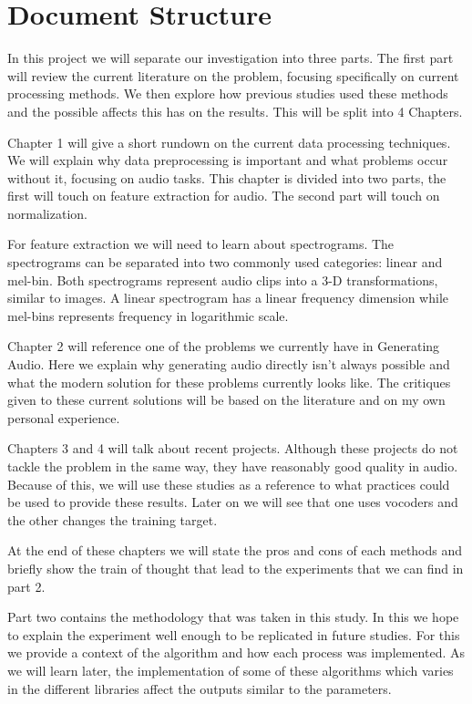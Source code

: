 \documentclass{book}
\begin{document}
\section{Document Structure}
\qquad In this project we will separate our investigation into three parts.
The first part will review the current literature on the problem, focusing specifically on current processing methods.
We then explore how previous studies used these methods and the possible affects this has on the results.
This will be split into 4 Chapters.
\par
Chapter 1 will give a short rundown on the current data processing techniques.
We will explain why data preprocessing is important and what problems occur without it, focusing on audio tasks.
This chapter is divided into two parts, the first will touch on feature extraction for audio.
The second part will touch on normalization.
\par
For feature extraction we will need to learn about spectrograms.
The spectrograms can be separated into two commonly used categories: linear and mel-bin.
Both spectrograms represent audio clips into a 3-D transformations, similar to images.
A linear spectrogram has a linear frequency dimension while mel-bins represents frequency in logarithmic scale.
\par
Chapter 2 will reference one of the problems we currently have in Generating Audio.
Here we explain why generating audio directly isn't always possible and what the modern solution for these problems currently looks like.
The critiques given to these current solutions will be based on the literature and on my own personal experience.
\par
Chapters 3 and 4 will talk about recent projects.
Although these projects do not tackle the problem in the same way, they have reasonably good quality in audio.
Because of this, we will use these studies as a reference to what practices could be used to provide these results.
Later on we will see that one uses vocoders and the other changes the training target.
\par
At the end of these chapters we will state the pros and cons of each methods and briefly show the train of thought that lead to the experiments that we can find in part 2.
\par Part two contains the methodology that was taken in this study.
In this we hope to explain the experiment well enough to be replicated in future studies.
For this we provide a context of the algorithm and how each process was implemented.
As we will learn later, the implementation of some of these algorithms which varies in the different libraries affect the outputs similar to the parameters.
\end{document}
